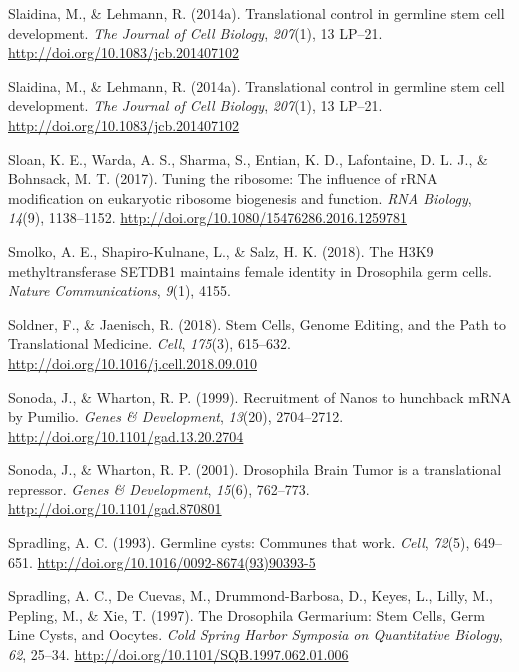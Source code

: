 \documentclass[12pt,twoside]{reedthesis}
\newlength{\cslhangindent}
\newenvironment{cslreferences}%
  {\setlength{\parindent}{0pt}%
  \everypar{\setlength{\hangindent}{\cslhangindent}}\ignorespaces}%
  {\par}
\begin{document}
\begin{cslreferences}
\leavevmode\hypertarget{ref-Slaidina2014h}{}%
Slaidina, M., \& Lehmann, R. (2014a). Translational control in germline stem cell development. \emph{The Journal of Cell Biology}, \emph{207}(1), 13 LP--21. \url{http://doi.org/10.1083/jcb.201407102}

\leavevmode\hypertarget{ref-Slaidina2014h}{}%
Slaidina, M., \& Lehmann, R. (2014a). Translational control in germline stem cell development. \emph{The Journal of Cell Biology}, \emph{207}(1), 13 LP--21. \url{http://doi.org/10.1083/jcb.201407102}

\leavevmode\hypertarget{ref-Sloan2017e}{}%
Sloan, K. E., Warda, A. S., Sharma, S., Entian, K. D., Lafontaine, D. L. J., \& Bohnsack, M. T. (2017). Tuning the ribosome: The influence of rRNA modification on eukaryotic ribosome biogenesis and function. \emph{RNA Biology}, \emph{14}(9), 1138--1152. \url{http://doi.org/10.1080/15476286.2016.1259781}

\leavevmode\hypertarget{ref-Smolko2018}{}%
Smolko, A. E., Shapiro-Kulnane, L., \& Salz, H. K. (2018). The H3K9 methyltransferase SETDB1 maintains female identity in Drosophila germ cells. \emph{Nature Communications}, \emph{9}(1), 4155.

\leavevmode\hypertarget{ref-Soldner2018d}{}%
Soldner, F., \& Jaenisch, R. (2018). Stem Cells, Genome Editing, and the Path to Translational Medicine. \emph{Cell}, \emph{175}(3), 615--632. \url{http://doi.org/10.1016/j.cell.2018.09.010}

\leavevmode\hypertarget{ref-Sonoda1999a}{}%
Sonoda, J., \& Wharton, R. P. (1999). Recruitment of Nanos to hunchback mRNA by Pumilio. \emph{Genes \& Development}, \emph{13}(20), 2704--2712. \url{http://doi.org/10.1101/gad.13.20.2704}

\leavevmode\hypertarget{ref-Sonoda2001d}{}%
Sonoda, J., \& Wharton, R. P. (2001). Drosophila Brain Tumor is a translational repressor. \emph{Genes \& Development}, \emph{15}(6), 762--773. \url{http://doi.org/10.1101/gad.870801}

\leavevmode\hypertarget{ref-Spradling1993b}{}%
Spradling, A. C. (1993). Germline cysts: Communes that work. \emph{Cell}, \emph{72}(5), 649--651. \url{http://doi.org/10.1016/0092-8674(93)90393-5}

\leavevmode\hypertarget{ref-Spradling1997e}{}%
Spradling, A. C., De Cuevas, M., Drummond-Barbosa, D., Keyes, L., Lilly, M., Pepling, M., \& Xie, T. (1997). The Drosophila Germarium: Stem Cells, Germ Line Cysts, and Oocytes. \emph{Cold Spring Harbor Symposia on Quantitative Biology}, \emph{62}, 25--34. \url{http://doi.org/10.1101/SQB.1997.062.01.006}


\end{cslreferences}
\end{document}
